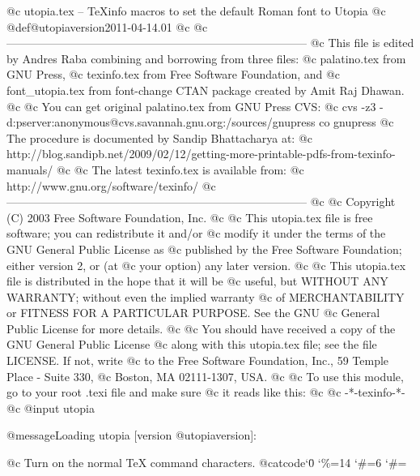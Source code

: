 @c utopia.tex -- TeXinfo macros to set the default Roman font to Utopia
@c
@def@utopiaversion{2011-04-14.01}
@c
@c--------------------------------------------------------------------------------
@c This file is edited by Andres Raba combining and borrowing from three files: 
@c palatino.tex from GNU Press,
@c texinfo.tex from Free Software Foundation, and
@c font_utopia.tex from font-change CTAN package created by Amit Raj Dhawan.
@c 
@c You can get original palatino.tex from GNU Press CVS:
@c cvs -z3 -d:pserver:anonymous@cvs.savannah.gnu.org:/sources/gnupress co gnupress
@c The procedure is documented by Sandip Bhattacharya at:
@c http://blog.sandipb.net/2009/02/12/getting-more-printable-pdfs-from-texinfo-manuals/
@c
@c The latest texinfo.tex is available from:
@c http://www.gnu.org/software/texinfo/
@c--------------------------------------------------------------------------------
@c
@c Copyright (C) 2003  Free Software Foundation, Inc.
@c
@c This utopia.tex file is free software; you can redistribute it and/or
@c modify it under the terms of the GNU General Public License as
@c published by the Free Software Foundation; either version 2, or (at
@c your option) any later version.
@c
@c This utopia.tex file is distributed in the hope that it will be
@c useful, but WITHOUT ANY WARRANTY; without even the implied warranty
@c of MERCHANTABILITY or FITNESS FOR A PARTICULAR PURPOSE.  See the GNU
@c General Public License for more details.
@c
@c You should have received a copy of the GNU General Public License
@c along with this utopia.tex file; see the file LICENSE.  If not, write
@c to the Free Software Foundation, Inc., 59 Temple Place - Suite 330,
@c Boston, MA 02111-1307, USA.
@c
@c To use this module, go to your root .texi file and make sure
@c it reads like this:
@c       @c -*-texinfo-*-
@c     @input utopia

@message{Loading utopia [version @utopiaversion]:}

@c Turn on the normal TeX command characters.
@catcode`\=0
\catcode`\%=14
\catcode`\#=6
\let\setfontorig=\setfont
\def\setfont#1#2#3#4{\font#1=#2#3 at #4}
\catcode`\#=\other

\def\rmfontprefix{mdput}

\def\rmshape{r7t}
\def\rmbshape{b7t}
\def\bfshape{b7t}
\def\bxshape{b7t}
\def\itshape{ri7t}
\def\itbshape{bi7t}
\def\slshape{ro7t}
\def\slbshape{bo7t}
\def\scshape{rfc8t}
\def\scbshape{bfc8t}

